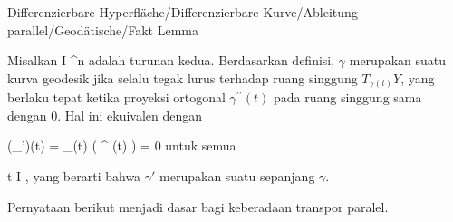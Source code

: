 {Differenzierbare Hyperfläche/Differenzierbare Kurve/Ableitung parallel/Geodätische/Fakt}
{Lemma}
{}
{

\faktzusatz {}
\faktzusatz {}

}
{

Misalkan
\maabbdisp {\gamma^{\prime \prime}} { I } { \R^n
} {}
adalah turunan kedua. Berdasarkan definisi, $\gamma$ merupakan suatu kurva geodesik jika
 selalu tegak lurus terhadap ruang singgung $T_{\gamma(t)} Y$, yang berlaku tepat ketika proyeksi ortogonal $\gamma^{\prime \prime}(t)$ pada ruang singgung sama dengan $0$. Hal ini ekuivalen dengan

\mavergleichskettedisp
{\vergleichskette
{ (\nabla_\gamma \gamma')(t)
}
{ =} { \pi_{\gamma(t)} \left(  \gamma^{\prime \prime} (t)  \right)
}
{ =} { 0
}
{ } {
}
{ } {
}
}
{}{}{}
untuk semua

\mavergleichskette
{\vergleichskette
{ t
}
{ \in }{ I
}
{  }{
}
{    }{
}
{   }{
}
}
{}{}{,}
yang berarti bahwa $\gamma'$ merupakan suatu
sepanjang $\gamma$.

}

Pernyataan berikut menjadi dasar bagi keberadaan transpor paralel.


